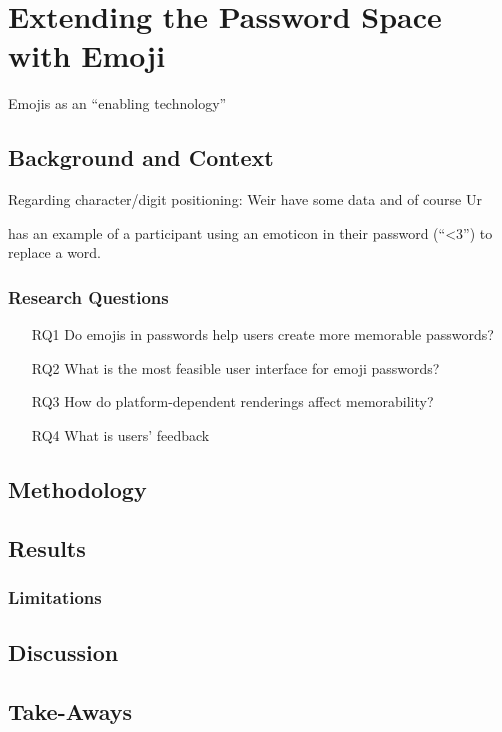 \chapter[Extending the Password Space with Emoji]{Extending the Password Space with Emoji}\label{chap:emojipasswords}


Emojis as an ``enabling technology''

\section{Background and Context}

Regarding character/digit positioning: Weir \etal have some data \cite{Weir2010MetricsPolicies} and of course Ur \etal \cite{Ur2015PWCreationLab}


\cite{Kuo2006HumanSelectionMnemonic} has an example of a participant using an emoticon in their password (``<3'') to replace a word. 

\subsection{Research Questions}

\begin{itemize}
	\item[RQ1] Do emojis in passwords help users create more memorable passwords?
	\item[RQ2] What is the most feasible user interface for emoji passwords?
	\item[RQ3] How do platform-dependent renderings affect memorability?
	\item[RQ4] What is users' feedback 
\end{itemize}

\section{Methodology}


\section{Results}


\subsection{Limitations}


\section{Discussion}


\section{Take-Aways}
